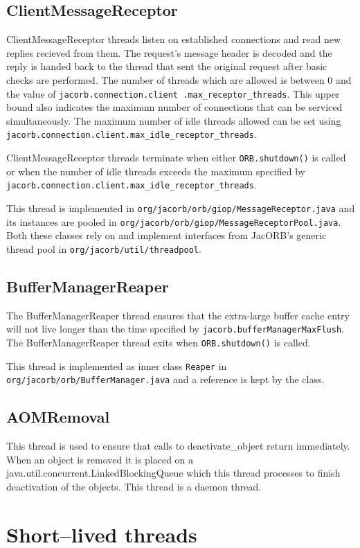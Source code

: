 \subsection*{ClientMessageReceptor}
ClientMessageReceptor threads listen on established connections and read new
replies recieved from them. The request's message header is decoded and the
reply is handed back to the thread that sent the original request after basic
checks are performed. The number of threads which are allowed is between 0 and
the value of {\tt jacorb.connection.client .max\_receptor\_threads}. This upper
bound also indicates the maximum number of connections that can be serviced
simultaneously. The maximum number of idle threads allowed can be set using
{\tt jacorb.connection.client.max\_idle\_receptor\_threads}.

ClientMessageReceptor threads terminate when either {\tt ORB.shutdown()}
is called or when the number of idle threads exceeds the maximum specified by
{\tt jacorb.connection.client.max\_idle\_receptor\_threads}.

This thread is implemented in {\tt org/jacorb/orb/giop/MessageReceptor.java}
and its instances are pooled in
{\tt org/jacorb/orb/giop/MessageReceptorPool.java}. Both these classes rely on
and implement interfaces from JacORB's generic thread pool in
{\tt org/jacorb/util/threadpool}.

\subsection*{BufferManagerReaper}
The BufferManagerReaper thread ensures that the extra-large buffer cache entry
will not live longer than the time specified by
{\tt jacorb.bufferManagerMaxFlush}. The BufferManagerReaper thread exits when
{\tt ORB.shutdown()} is called.

This thread is implemented as inner class {\tt Reaper} in {\tt
org/jacorb/orb/BufferManager.java} and a reference is kept by the class.

\subsection*{AOMRemoval}
This thread is used to ensure that calls to deactivate\_object return
immediately. When an object is removed it is placed on a java.util.concurrent.LinkedBlockingQueue
which this thread processes to finish deactivation of the objects. This thread is a daemon thread.

\section*{Short--lived threads}

